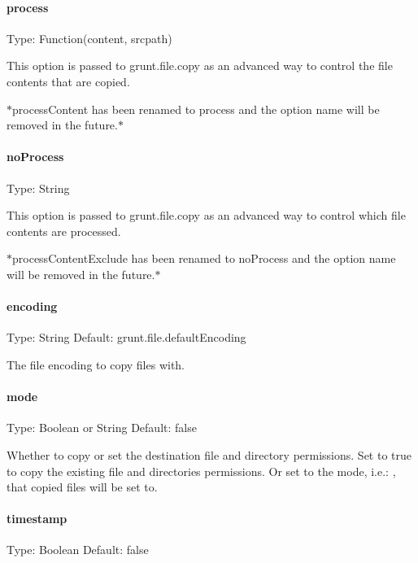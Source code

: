 \paragraph*{process}

Type\+: {\ttfamily Function(content, srcpath)}

This option is passed to {\ttfamily grunt.\+file.\+copy} as an advanced way to control the file contents that are copied.

$\ast${\ttfamily process\+Content} has been renamed to {\ttfamily process} and the option name will be removed in the future.$\ast$

\paragraph*{no\+Process}

Type\+: {\ttfamily String}

This option is passed to {\ttfamily grunt.\+file.\+copy} as an advanced way to control which file contents are processed.

$\ast${\ttfamily process\+Content\+Exclude} has been renamed to {\ttfamily no\+Process} and the option name will be removed in the future.$\ast$

\paragraph*{encoding}

Type\+: {\ttfamily String} Default\+: {\ttfamily grunt.\+file.\+default\+Encoding}

The file encoding to copy files with.

\paragraph*{mode}

Type\+: {\ttfamily Boolean} or {\ttfamily String} Default\+: {\ttfamily false}

Whether to copy or set the destination file and directory permissions. Set to {\ttfamily true} to copy the existing file and directories permissions. Or set to the mode, i.\+e.\+: {}, that copied files will be set to.

\paragraph*{timestamp}

Type\+: {\ttfamily Boolean} Default\+: {\ttfamily false}

